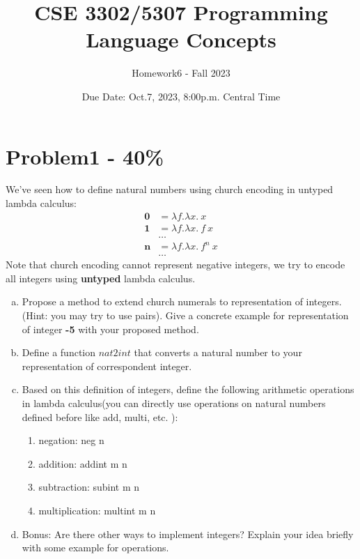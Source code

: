 \documentclass{article}
\begin{document}
\title{CSE 3302/5307 Programming Language Concepts}
\author{Homework6 - Fall 2023}
\date{Due Date: Oct.7, 2023, 8:00p.m. Central Time}
\maketitle
\thispagestyle{fancy}


\section*{Problem1 - 40\%}

We've seen how to define natural numbers using church encoding in untyped lambda calculus:
\begin{align*}
    \mathbf{0} &= \lambda f.\lambda x.\ x \\
    \mathbf{1} &= \lambda f.\lambda x.\ f\ x \\
    &\dots \\
    \mathbf{n} &= \lambda f.\lambda x.\ f^n\ x \\
    &\dots
\end{align*}
Note that church encoding cannot represent negative integers, we try to encode all integers using \textbf{untyped} lambda calculus.
\begin{enumerate}[(a)]
\item Propose a method to extend church numerals to representation of integers.(Hint: you may try to use pairs). Give a concrete example for representation of integer \textbf{-5} with your proposed method.

\item Define a function $nat2int$ that converts a natural number to your representation of correspondent integer.

\item Based on this definition of integers, define the following arithmetic operations in lambda calculus(you can directly use operations on natural numbers defined before like add, multi, etc. ): 
    \begin{enumerate}[(1)]
        \item negation: neg n
        \item addition: addint m n
        \item subtraction: subint m n
        \item multiplication: multint m n	
    \end{enumerate}
\item Bonus: Are there other ways to implement integers? Explain your idea briefly with some example for operations.
\end{enumerate}
\end{document}
